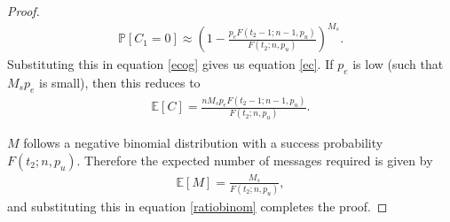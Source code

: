 \documentclass[conference]{IEEEtran}
\begin{document}
\begin{proof}
\begin{align*}
    \mathbb{P}[C_1=0] \approx \left(\displaystyle 1-\frac{p_e F(t_2-1; n-1, p_u)}{F(t_2; n, p_u)}\right)^{M_s}.
\end{align*}
Substituting this in equation \eqref{ecog} gives us equation \eqref{ec}. If $p_e$ is low (such that $M_sp_e$ is small), then this reduces to 
\begin{align}\label{ratiobinom}
    \mathbb{E}[C] = \frac{nM_sp_e F(t_2-1; n-1, p_u)}{F(t_2; n, p_u)}.
\end{align}

$M$ follows a negative binomial distribution with a success probability $F(t_2; n, p_u)$. Therefore the expected number of messages required is given by
\begin{align}\label{expmsgsproof}
    \mathbb{E}[M] = \frac{M_s}{F(t_2; n, p_u)},
\end{align}
and substituting this in equation \eqref{ratiobinom} completes the proof.
\end{proof}
 
 
\end{document}

